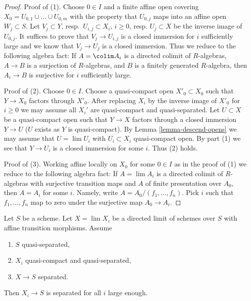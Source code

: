 \begin{proof}
Proof of (1). Choose $0 \in I$ and a finite affine open covering
$X_0 = U_{0, 1} \cup \ldots \cup U_{0, m}$ with the property that
$U_{0, j}$ maps into an affine open $W_j \subset S$.
Let $V_j \subset Y$, resp.\ $U_{i, j} \subset X_i$, $i \geq 0$,
resp. $U_j \subset X$ be the inverse image of $U_{0, j}$. It suffices
to prove that $V_j \to U_{i, j}$ is a closed immersion for $i$
sufficiently large and we know that $V_j \to U_j$ is a closed immersion.
Thus we reduce to the following algebra fact: If $A = \colim A_i$ is a
directed colimit of $R$-algebras, $A \to B$ is a surjection of $R$-algebras,
and $B$ is a finitely generated $R$-algebra, then
$A_i \to B$ is surjective for $i$ sufficiently large.

\medskip\noindent
Proof of (2). Choose $0 \in I$. Choose a quasi-compact open
$X'_0 \subset X_0$ such that $Y \to X_0$ factors through $X'_0$.
After replacing $X_i$ by the inverse image of $X'_0$ for $i \geq 0$
we may assume all $X_i'$ are quasi-compact and quasi-separated.
Let $U \subset X$ be a quasi-compact open such that $Y \to X$ factors
through a closed immersion $Y \to U$ ($U$ exists as $Y$ is quasi-compact). By
Lemma \ref{lemma-descend-opens}
we may assume that $U = \lim U_i$ with $U_i \subset X_i$ quasi-compact
open. By part (1) we see that $Y \to U_i$ is a closed immersion for some
$i$. Thus (2) holds.

\medskip\noindent
Proof of (3). Working affine locally on $X_0$ for some $0 \in I$ as in
the proof of (1) we reduce to the following algebra fact: If $A = \lim A_i$
is a directed colimit of $R$-algebras with surjective transition
maps and $A$ of finite presentation over $A_0$, then $A = A_i$ for
some $i$. Namely, write $A = A_0/(f_1, \ldots, f_n)$. Pick $i$ such
that $f_1, \ldots, f_n$ map to zero under the surjective map $A_0 \to A_i$.
\end{proof}

\begin{lemma}
\label{lemma-eventually-separated}
Let $S$ be a scheme. Let $X = \lim X_i$ be a directed
limit of schemes over $S$ with affine transition morphisms.
Assume
\begin{enumerate}
\item $S$ quasi-separated,
\item $X_i$ quasi-compact and quasi-separated,
\item $X \to S$ separated.
\end{enumerate}
Then $X_i \to S$ is separated for all $i$ large enough.
\end{lemma}

